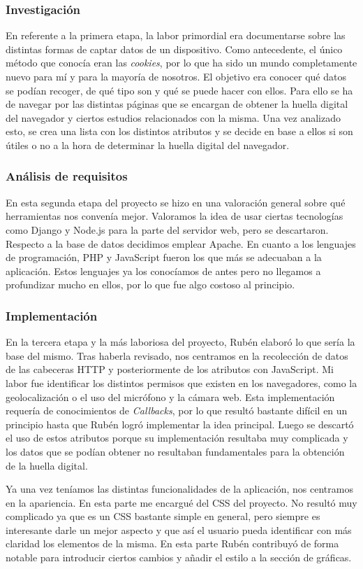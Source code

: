 \subsubsection{Investigación}
En referente a la primera etapa, la labor primordial era documentarse sobre las distintas formas de captar datos de un dispositivo. Como antecedente, el único método que conocía eran las \textit{cookies}, por lo que ha sido un mundo completamente nuevo para mí y para la mayoría de nosotros. El objetivo era conocer qué datos se podían recoger, de qué tipo son y qué se puede hacer con ellos. Para ello se ha de navegar por las distintas páginas que se encargan de obtener la huella digital del navegador y ciertos estudios relacionados con la misma. Una vez analizado esto, se crea una lista con los distintos atributos y se decide en base a ellos si son útiles o no a la hora de determinar la huella digital del navegador.
\subsubsection{Análisis de requisitos}
En esta segunda etapa del proyecto se hizo en una valoración general sobre qué herramientas nos convenía mejor. Valoramos la idea de usar ciertas tecnologías como Django y Node.js para la parte del servidor web, pero se descartaron. Respecto a la base de datos decidimos emplear Apache. En cuanto a los lenguajes de programación, PHP y JavaScript fueron los que más se adecuaban a la aplicación. Estos lenguajes ya los conocíamos de antes pero no llegamos a profundizar mucho en ellos, por lo que fue algo costoso al principio.
\subsubsection{Implementación}
En la tercera etapa y la más laboriosa del proyecto, Rubén elaboró lo que sería la base del mismo. Tras haberla revisado, nos centramos en la recolección de datos de las cabeceras HTTP y posteriormente de los atributos con JavaScript. Mi labor fue identificar los distintos permisos que existen en los navegadores, como la geolocalización o el uso del micrófono y la cámara web. Esta implementación requería de conocimientos de \textit{Callbacks}, por lo que resultó bastante difícil en un principio hasta que Rubén logró implementar la idea principal. Luego se descartó el uso de estos atributos porque su implementación resultaba muy complicada y los datos que se podían obtener no resultaban fundamentales para la obtención de la huella digital.\par
Ya una vez teníamos las distintas funcionalidades de la aplicación, nos centramos en la apariencia. En esta parte me encargué del CSS del proyecto. No resultó muy complicado ya que es un CSS bastante simple en general, pero siempre es interesante darle un mejor aspecto y que así el usuario pueda identificar con más claridad los elementos de la misma. En esta parte Rubén contribuyó de forma notable para introducir ciertos cambios y añadir el estilo a la sección de gráficas. 

